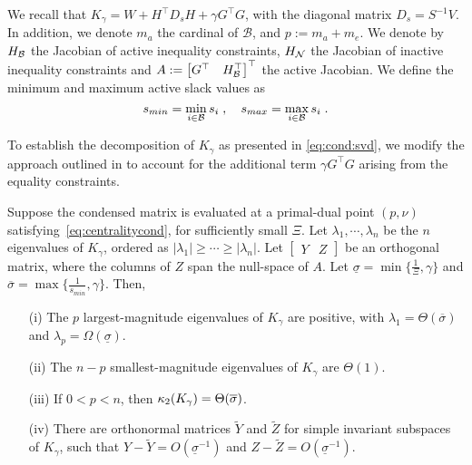We recall that $K_\gamma = W + H^\top D_s H + \gamma G^\top G$, with
the diagonal matrix $D_s = S^{-1} V$.
In addition, we denote $m_a$ the cardinal of $\mathcal{B}$,
and $p := m_a + m_e$. We denote by
$H_{\mathcal{B}}$ the Jacobian of active inequality constraints, $H_{\mathcal{N}}$ the
Jacobian of inactive inequality constraints and
$A := \begin{bmatrix} G^\top & H_{\mathcal{B}}^\top \end{bmatrix}^\top$ the active Jacobian.
We define the minimum and maximum active slack values as
\begin{equation}
  s_{min} = \min_{i \in \mathcal{B}} s_i \; , \quad
  s_{max} = \max_{i \in \mathcal{B}} s_i \; .
\end{equation}

To establish the decomposition of $K_\gamma$ as presented in \eqref{eq:cond:svd},
we modify the approach outlined in \cite[Theorem 3.2]{wright1998ill} to account for the additional
term $\gamma G^\top G$ arising from the equality constraints.
\begin{theorem}
  \label{thm:cond}
  Suppose the condensed matrix is evaluated at a primal-dual
  point $(p, \nu)$ satisfying~\eqref{eq:centralitycond},
  for sufficiently small $\Xi$.
  Let $\lambda_1, \cdots, \lambda_n$ be the $n$ eigenvalues of
  $K_\gamma$, ordered as $|\lambda_1| \geq  \cdots \geq |\lambda_n|$.
  Let $\begin{bmatrix} Y & Z \end{bmatrix}$ be an orthogonal
  matrix, where the columns of $Z$ span the null-space of
  $A$. Let $\underline{\sigma} =\min\{\frac{1}{\Xi}, \gamma\}$
  and $\overline{\sigma} = \max\{\frac{1}{s_{min}}, \gamma\}$.
  Then,
  \begin{enumerate}
    \item[(i)] The $p$ largest-magnitude eigenvalues of $K_\gamma$ are positive,
      with $\lambda_1 = \Theta(\overline{\sigma})$ and $\lambda_p = \Omega(\underline{\sigma})$.
    \item[(ii)] The $n-p$ smallest-magnitude eigenvalues of $K_\gamma$
      are $\Theta(1)$.
    \item[(iii)] If $0 < p < n$, then $\kappa_2(K_\gamma) = \Theta(\overline{\sigma})$.
    \item[(iv)] There are orthonormal matrices $\widetilde{Y}$ and $\widetilde{Z}$ for
      simple invariant subspaces of $K_\gamma$, such that $Y - \widetilde{Y} = O(\underline{\sigma}^{-1})$
      and $Z - \widetilde{Z} = O(\underline{\sigma}^{-1})$.
  \end{enumerate}
\end{theorem}
